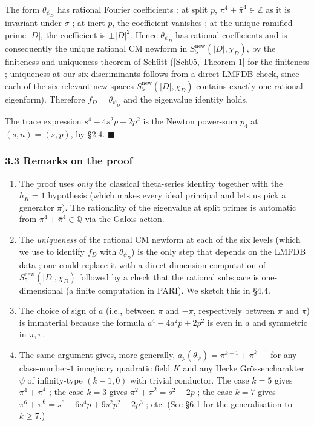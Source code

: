 \documentclass[
  11pt,
  a4paper,
]{amsart}
\begin{document}
The form \(\theta_{\psi_D}\) has rational Fourier coefficients : at split \(p\), \(\pi^4 + \bar\pi^4 \in \mathbb{Z}\) as it is invariant under \(\sigma\) ; at inert \(p\), the coefficient vanishes ; at the unique ramified prime \(|D|\), the coefficient is \(\pm |D|^2\). Hence \(\theta_{\psi_D}\) has rational coefficients and is consequently the unique rational CM newform in \(S_5^{\mathrm{new}}(|D|, \chi_D)\), by the finiteness and uniqueness theorem of Schütt ({[}Sch05, Theorem 1{]} for the finiteness ; uniqueness at our six discriminants follows from a direct LMFDB check, since each of the six relevant new spaces \(S_5^{\mathrm{new}}(|D|, \chi_D)\) contains exactly one rational eigenform). Therefore \(f_D = \theta_{\psi_D}\) and the eigenvalue identity holds.

The trace expression \(s^4 - 4 s^2 p + 2 p^2\) is the Newton power-sum \(p_4\) at \((s, n) = (s, p)\), by §2.4. \(\blacksquare\)

\hypertarget{remarks-on-the-proof}{%
\subsubsection{3.3 Remarks on the proof}\label{remarks-on-the-proof}}

\begin{enumerate}
\def\labelenumi{(\alph{enumi})}
\item
  The proof uses \emph{only} the classical theta-series identity together with the \(h_K = 1\) hypothesis (which makes every ideal principal and lets us pick a generator \(\pi\)). The rationality of the eigenvalue at split primes is automatic from \(\pi^4 + \bar\pi^4 \in \mathbb{Q}\) via the Galois action.
\item
  The \emph{uniqueness} of the rational CM newform at each of the six levels (which we use to identify \(f_D\) with \(\theta_{\psi_D}\)) is the only step that depends on the LMFDB data ; one could replace it with a direct dimension computation of \(S_5^{\mathrm{new}}(|D|, \chi_D)\) followed by a check that the rational subspace is one-dimensional (a finite computation in PARI). We sketch this in §4.4.
\item
  The choice of sign of \(a\) (i.e., between \(\pi\) and \(-\pi\), respectively between \(\pi\) and \(\bar\pi\)) is immaterial because the formula \(a^4 - 4 a^2 p + 2 p^2\) is even in \(a\) and symmetric in \(\pi, \bar\pi\).
\item
  The same argument gives, more generally, \(a_p(\theta_{\psi}) = \pi^{k-1} + \bar\pi^{k-1}\) for any class-number-\(1\) imaginary quadratic field \(K\) and any Hecke Grössencharakter \(\psi\) of infinity-type \((k - 1, 0)\) with trivial conductor. The case \(k = 5\) gives \(\pi^4 + \bar\pi^4\) ; the case \(k = 3\) gives \(\pi^2 + \bar\pi^2 = s^2 - 2p\) ; the case \(k = 7\) gives \(\pi^6 + \bar\pi^6 = s^6 - 6 s^4 p + 9 s^2 p^2 - 2 p^3\) ; etc. (See §6.1 for the generalisation to \(k \geq 7\).)
\end{enumerate}
\end{document}
